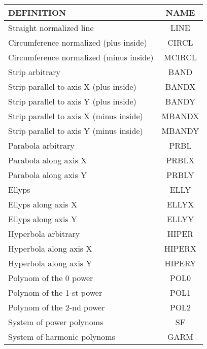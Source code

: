 {\begin{table}
  \begin{center}
  \begin{tabular}{|l|c|} \hline
     { DEFINITION}                               & { NAME} \\ \hline
     Straight normalized line                    & LINE    \\ \hline
     Circumference normalized (plus inside)      & CIRCL   \\
     Circumference normalized (minus inside)     & MCIRCL  \\ \hline
     Strip  arbitrary                            & BAND    \\
     Strip  parallel to axis X (plus inside)     & BANDX   \\
     Strip  parallel to axis Y (plus inside)     & BANDY   \\
     Strip  parallel to axis X (minus inside)    & MBANDX  \\
     Strip  parallel to axis Y (minus inside)    & MBANDY  \\ \hline
    Parabola  arbitrary                          & PRBL    \\
    Parabola  along axis X                       & PRBLX   \\
    Parabola  along axis Y                       & PRBLY   \\ \hline
    Ellyps                                       & ELLY    \\
    Ellyps   along axis X                        & ELLYX   \\
    Ellyps   along axis Y                        & ELLYY   \\ \hline
    Hyperbola arbitrary                          & HIPER   \\
    Hyperbola along axis X                       & HIPERX  \\
    Hyperbola along axis Y                       & HIPERY  \\ \hline
     Polynom of the 0 power                      & POL0    \\
     Polynom of the 1-st power                   & POL1    \\
     Polynom of the 2-nd power                   & POL2    \\ \hline
     System of power polynoms                    & SF      \\
     System of harmonic polynoms                 & GARM    \\

\end{tabular}
\end{center}
\end{table}}
